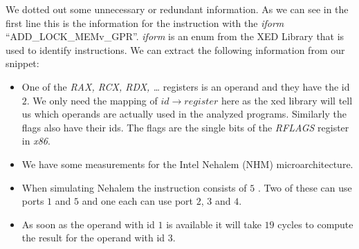 We dotted out some unnecessary or redundant information. As we can see in the first line this is the information for the instruction with the \emph{iform} ``ADD\_LOCK\_MEMv\_GPR''. \emph{iform} is an enum from the XED Library \cite{xed} that is used to identify instructions. We can extract the following information from our snippet:

\begin{itemize}
    \item One of the \emph{RAX, RCX, RDX, \dots} registers is an operand and they have the id $2$. We only need the mapping of $id \rightarrow register$ here as the xed library will tell us which operands are actually used in the analyzed programs. Similarly the flags also have their ids. The flags are the single bits of the \emph{RFLAGS} register in \emph{x86}.
    \item We have some measurements for the Intel Nehalem (NHM) microarchitecture.
    \item When simulating Nehalem the instruction consists of $5$ \microops. Two of these can use ports $1$ and $5$ and one each can use port $2$, $3$ and $4$.
    \item As soon as the operand with id $1$ is available it will take $19$ cycles to compute the result for the operand with id $3$.
\end{itemize}

